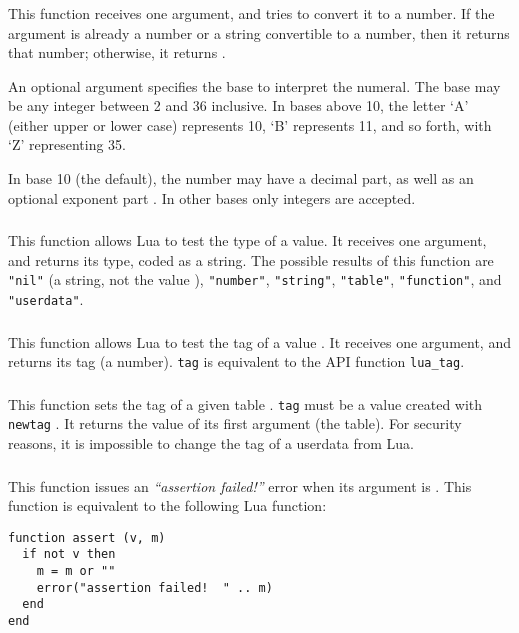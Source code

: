 \subsubsection*{\ff {}}
This function receives one argument,
and tries to convert it to a number.
If the argument is already a number or a string convertible
to a number, then it returns that number;
otherwise, it returns \nil.

An optional argument specifies the base to interpret the numeral.
The base may be any integer between 2 and 36 inclusive.
In bases above  10, the letter `A' (either upper or lower case)
represents 10, `B' represents 11, and so forth, with `Z' representing 35.

In base 10 (the default), the number may have a decimal part,
as well as an optional exponent part .
In other bases only integers are accepted.

\subsubsection*{\ff {}}\label{pdf-type}
This function allows Lua to test the type of a value.
It receives one argument, and returns its type, coded as a string.
The possible results of this function are
\verb|"nil"| (a string, not the value \nil),
\verb|"number"|,
\verb|"string"|,
\verb|"table"|,
\verb|"function"|,
and \verb|"userdata"|.

\subsubsection*{\ff {}}
This function allows Lua to test the tag of a value .
It receives one argument, and returns its tag (a number).
\verb|tag| is equivalent to the API function \verb|lua_tag|.

\subsubsection*{\ff {}}
This function sets the tag of a given table .
\verb|tag| must be a value created with \verb|newtag|
.
It returns the value of its first argument (the table).
For security reasons,
it is impossible to change the tag of a userdata from Lua.


\subsubsection*{\ff {}}
This function issues an \emph{``assertion failed!''} error
when its argument is \nil.
This function is equivalent to the following Lua function:
\begin{verbatim}
function assert (v, m)
  if not v then
    m = m or ""
    error("assertion failed!  " .. m)
  end
end
\end{verbatim}

